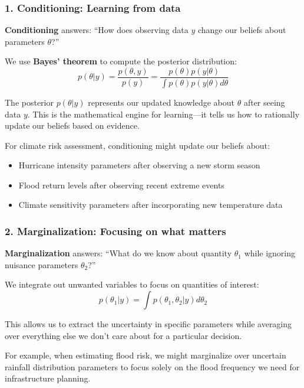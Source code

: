 \documentclass[
  letterpaper,
  DIV=11,
  numbers=noendperiod]{scrreprt}
\providecommand{\tightlist}{%
  \setlength{\itemsep}{0pt}\setlength{\parskip}{0pt}}
\begin{document}
\subsubsection{1. Conditioning: Learning from
data}\label{conditioning-learning-from-data}

\textbf{Conditioning} answers: ``How does observing data \(y\) change
our beliefs about parameters \(\theta\)?''

We use \textbf{Bayes' theorem} to compute the posterior distribution:
\[p(\theta | y) = \frac{p(\theta, y)}{p(y)} = \frac{p(\theta) p(y | \theta)}{\int p(\theta) p(y | \theta) d\theta}\]

The posterior \(p(\theta | y)\) represents our updated knowledge about
\(\theta\) after seeing data \(y\). This is the mathematical engine for
learning---it tells us how to rationally update our beliefs based on
evidence.

For climate risk assessment, conditioning might update our beliefs
about:

\begin{itemize}
\tightlist
\item
  Hurricane intensity parameters after observing a new storm season
\item
  Flood return levels after observing recent extreme events\\
\item
  Climate sensitivity parameters after incorporating new temperature
  data
\end{itemize}

\subsubsection{2. Marginalization: Focusing on what
matters}\label{marginalization-focusing-on-what-matters}

\textbf{Marginalization} answers: ``What do we know about quantity
\(\theta_1\) while ignoring nuisance parameters \(\theta_2\)?''

We integrate out unwanted variables to focus on quantities of interest:
\[p(\theta_1 | y) = \int p(\theta_1, \theta_2 | y) d\theta_2\]

This allows us to extract the uncertainty in specific parameters while
averaging over everything else we don't care about for a particular
decision.

For example, when estimating flood risk, we might marginalize over
uncertain rainfall distribution parameters to focus solely on the flood
frequency we need for infrastructure planning.
\end{document}
